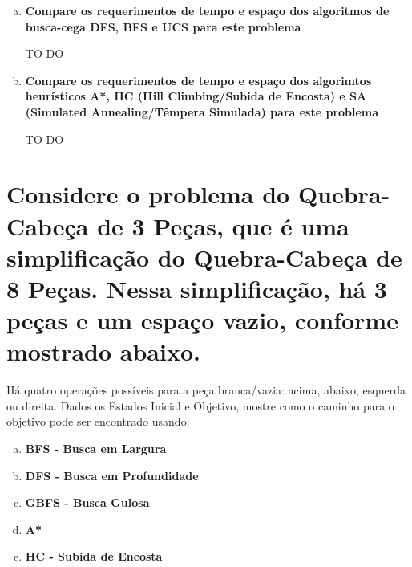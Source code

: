 \documentclass[paper=a4, fontsize=11pt]{scrartcl} %
\begin{document}
\begin{enumerate}[(a)]
        \item \textbf{Compare os requerimentos de tempo e espaço dos algoritmos de busca-cega DFS, BFS e UCS para este problema}
        \par TO-DO
        \vspace{0.2cm}

        \item \textbf{Compare os requerimentos de tempo e espaço dos algorimtos heurísticos A*, HC (Hill Climbing/Subida de Encosta) e SA (Simulated Annealing/Têmpera Simulada) para este problema}
        \par TO-DO
        \vspace{0.2cm}


    \end{enumerate}

    
    \section{Considere o problema do Quebra-Cabeça de 3 Peças, que é uma simplificação do Quebra-Cabeça de 8 Peças. Nessa simplificação, há 3 peças e um espaço vazio, conforme mostrado abaixo. }
    

    \par{Há quatro operações possíveis para a peça branca/vazia: acima, abaixo, esquerda ou direita. Dados os Estados Inicial e Objetivo, mostre como o caminho para o objetivo pode ser encontrado usando:}
    \pagebreak
    \begin{enumerate}[(a)]
        \item \textbf{BFS - Busca em Largura}
        \par 
        \vspace{0.2cm}

        \item \textbf{DFS - Busca em Profundidade}
        \par 
        \vspace{0.2cm}

        \pagebreak
        \item \textbf{GBFS - Busca Gulosa}
        \par 
        \vspace{0.2cm}

        \item \textbf{A*}
        \par 
        \vspace{0.2cm}

        \pagebreak
        \item \textbf{HC - Subida de Encosta}
        \par 
        \vspace{0.2cm}

    \end{enumerate}
\end{document}
